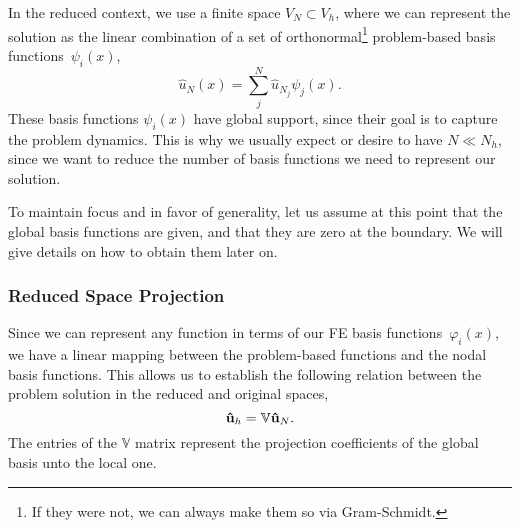\documentclass[../main.tex]{subfiles}
\newcommand{\rbV}{\ensuremath{\mathbb{V}}}
\begin{document}
In the reduced context, we use a finite space $V_N \subset V_h$, where we can represent the solution as the linear combination of a set of orthonormal\footnote{If they were not, we can always make them so via Gram-Schmidt.} problem-based basis functions~$\psi_i(x)$,
\begin{equation}
    \label{eq:1d_rom_heat_equation_rb_expansion}
    \hat{u}_N(x) = \sum_j^{N} \hat{u}_{N_j} \psi_j(x).
\end{equation}
These basis functions $\psi_i(x)$ have global support, since their goal is to capture the problem dynamics. 
This is why we usually expect or desire to have $N \ll N_h$, since we want to reduce the number of basis functions we need to represent our solution. 

To maintain focus and in favor of generality, let us assume at this point that the global basis functions are given, and that they are zero at the boundary.
We will give details on how to obtain them later on.

\subsubsection{Reduced Space Projection}
Since we can represent any function in terms of our FE basis functions~$\varphi_i(x)$, 
we have a linear mapping between the problem-based functions and the nodal basis functions.
This allows us to establish the following relation between the problem solution in the reduced and original spaces,
\begin{equation}
    \label{eq:1d_rom_heat_equation_projection_relation}
    \vb{\hat{u}}_h = \rbV \vb{\hat{u}}_N.
\end{equation}
The entries of the $\rbV$ matrix represent the projection coefficients of the global basis unto the local one. 
\end{document}
